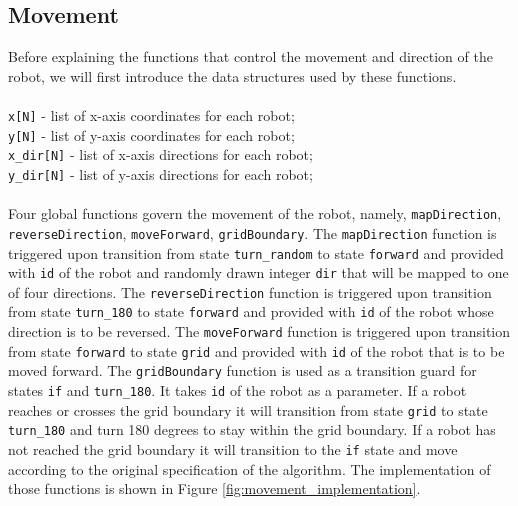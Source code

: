 \subsection{Movement}
Before explaining the functions that control the movement and direction of the robot, we will first introduce the data structures used by these functions.
\\\\
\texttt{x[N]} - list of x-axis coordinates for each robot;\\
\texttt{y[N]} - list of y-axis coordinates for each robot;\\
\texttt{x\_dir[N]} - list of x-axis directions for each robot;\\
\texttt{y\_dir[N]} - list of y-axis directions for each robot;\\
\\
\noindent
Four global functions govern the movement of the robot, namely, \texttt{mapDirection}, \texttt{reverseDirection}, \texttt{moveForward}, \texttt{gridBoundary}. The \texttt{mapDirection} function is triggered upon transition from state \texttt{turn\_random} to state \texttt{forward} and provided with \texttt{id} of the robot and randomly drawn integer \texttt{dir} that will be mapped to one of four directions. The \texttt{reverseDirection} function is triggered upon transition from state \texttt{turn\_180} to state \texttt{forward} and provided with \texttt{id} of the robot whose direction is to be reversed. The \texttt{moveForward} function is triggered upon transition from state \texttt{forward} to state \texttt{grid} and provided with \texttt{id} of the robot that is to be moved forward. The \texttt{gridBoundary} function is used as a transition guard for states \texttt{if} and \texttt{turn\_180}. It takes \texttt{id} of the robot as a parameter. If a robot reaches or crosses the grid boundary it will transition from state \texttt{grid} to state \texttt{turn\_180} and turn 180 degrees to stay within the grid boundary. If a robot has not reached the grid boundary it will transition to the \texttt{if} state and move according to the original specification of the algorithm. The implementation of those functions is shown in Figure \ref{fig:movement_implementation}.


